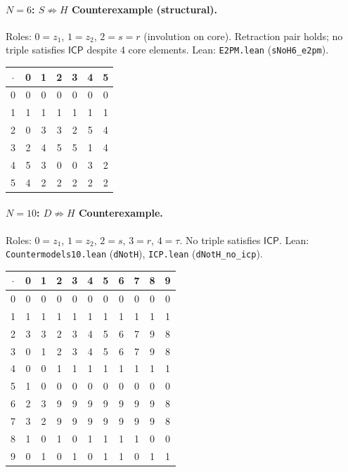 \documentclass[sigconf,screen,review,anonymous]{acmart}
\newcommand{\dotop}{\cdot}
\newcommand{\ICP}{\textsf{ICP}}
\begin{document}
\paragraph{$N\!=\!6$: $S \not\Rightarrow H$ Counterexample (structural).}
Roles: $0 = z_1$, $1 = z_2$, $2 = s = r$ (involution on core). Retraction pair holds; no triple satisfies $\ICP$ despite 4 core elements. \quad Lean: \texttt{E2PM.lean} (\texttt{sNoH6\_e2pm}).

\medskip
{\small
\begin{tabular}{c|cccccc}
$\dotop$ & 0 & 1 & 2 & 3 & 4 & 5 \\\hline
0 & 0 & 0 & 0 & 0 & 0 & 0 \\
1 & 1 & 1 & 1 & 1 & 1 & 1 \\
2 & 0 & 3 & 3 & 2 & 5 & 4 \\
3 & 2 & 4 & 5 & 5 & 1 & 4 \\
4 & 5 & 3 & 0 & 0 & 3 & 2 \\
5 & 4 & 2 & 2 & 2 & 2 & 2 \\
\end{tabular}}

\paragraph{$N\!=\!10$: $D \not\Rightarrow H$ Counterexample.}
Roles: $0 = z_1$, $1 = z_2$, $2 = s$, $3 = r$, $4 = \tau$. No triple satisfies $\ICP$. \quad Lean: \texttt{Countermodels10.lean} (\texttt{dNotH}), \texttt{ICP.lean} (\texttt{dNotH\_no\_icp}).

\medskip
{\footnotesize
\begin{tabular}{c|cccccccccc}
$\dotop$ & 0 & 1 & 2 & 3 & 4 & 5 & 6 & 7 & 8 & 9 \\\hline
0 & 0 & 0 & 0 & 0 & 0 & 0 & 0 & 0 & 0 & 0 \\
1 & 1 & 1 & 1 & 1 & 1 & 1 & 1 & 1 & 1 & 1 \\
2 & 3 & 3 & 2 & 3 & 4 & 5 & 6 & 7 & 9 & 8 \\
3 & 0 & 1 & 2 & 3 & 4 & 5 & 6 & 7 & 9 & 8 \\
4 & 0 & 0 & 1 & 1 & 1 & 1 & 1 & 1 & 1 & 1 \\
5 & 1 & 0 & 0 & 0 & 0 & 0 & 0 & 0 & 0 & 0 \\
6 & 2 & 3 & 9 & 9 & 9 & 9 & 9 & 9 & 9 & 8 \\
7 & 3 & 2 & 9 & 9 & 9 & 9 & 9 & 9 & 9 & 8 \\
8 & 1 & 0 & 1 & 0 & 1 & 1 & 1 & 1 & 0 & 0 \\
9 & 0 & 1 & 0 & 1 & 0 & 1 & 1 & 0 & 1 & 1 \\
\end{tabular}}
\end{document}
